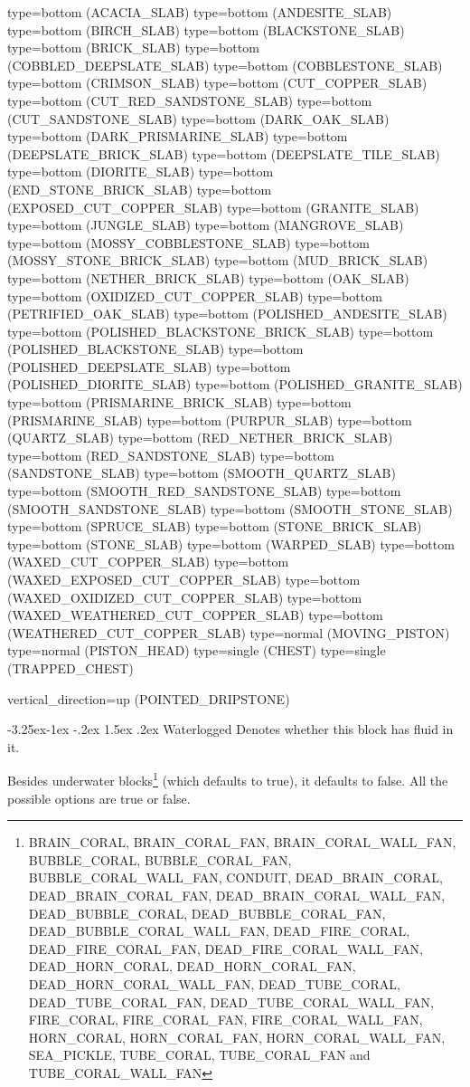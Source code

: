 \documentclass[11pt]{article}
\makeatletter
\renewcommand\subsubsection{\@startsection{subsubsection}{3}{\z@}%
                                        {-3.25ex\@plus -1ex \@minus -.2ex}%
                                         {1.5ex \@plus .2ex}%
                                         {\normalfont\normalsize\fontfamily{phv}\fontsize{14}{17}\selectfont}}
\makeatother
\begin{document}
type=bottom (ACACIA_SLAB)
type=bottom (ANDESITE_SLAB)
type=bottom (BIRCH_SLAB)
type=bottom (BLACKSTONE_SLAB)
type=bottom (BRICK_SLAB)
type=bottom (COBBLED_DEEPSLATE_SLAB)
type=bottom (COBBLESTONE_SLAB)
type=bottom (CRIMSON_SLAB)
type=bottom (CUT_COPPER_SLAB)
type=bottom (CUT_RED_SANDSTONE_SLAB)
type=bottom (CUT_SANDSTONE_SLAB)
type=bottom (DARK_OAK_SLAB)
type=bottom (DARK_PRISMARINE_SLAB)
type=bottom (DEEPSLATE_BRICK_SLAB)
type=bottom (DEEPSLATE_TILE_SLAB)
type=bottom (DIORITE_SLAB)
type=bottom (END_STONE_BRICK_SLAB)
type=bottom (EXPOSED_CUT_COPPER_SLAB)
type=bottom (GRANITE_SLAB)
type=bottom (JUNGLE_SLAB)
type=bottom (MANGROVE_SLAB)
type=bottom (MOSSY_COBBLESTONE_SLAB)
type=bottom (MOSSY_STONE_BRICK_SLAB)
type=bottom (MUD_BRICK_SLAB)
type=bottom (NETHER_BRICK_SLAB)
type=bottom (OAK_SLAB)
type=bottom (OXIDIZED_CUT_COPPER_SLAB)
type=bottom (PETRIFIED_OAK_SLAB)
type=bottom (POLISHED_ANDESITE_SLAB)
type=bottom (POLISHED_BLACKSTONE_BRICK_SLAB)
type=bottom (POLISHED_BLACKSTONE_SLAB)
type=bottom (POLISHED_DEEPSLATE_SLAB)
type=bottom (POLISHED_DIORITE_SLAB)
type=bottom (POLISHED_GRANITE_SLAB)
type=bottom (PRISMARINE_BRICK_SLAB)
type=bottom (PRISMARINE_SLAB)
type=bottom (PURPUR_SLAB)
type=bottom (QUARTZ_SLAB)
type=bottom (RED_NETHER_BRICK_SLAB)
type=bottom (RED_SANDSTONE_SLAB)
type=bottom (SANDSTONE_SLAB)
type=bottom (SMOOTH_QUARTZ_SLAB)
type=bottom (SMOOTH_RED_SANDSTONE_SLAB)
type=bottom (SMOOTH_SANDSTONE_SLAB)
type=bottom (SMOOTH_STONE_SLAB)
type=bottom (SPRUCE_SLAB)
type=bottom (STONE_BRICK_SLAB)
type=bottom (STONE_SLAB)
type=bottom (WARPED_SLAB)
type=bottom (WAXED_CUT_COPPER_SLAB)
type=bottom (WAXED_EXPOSED_CUT_COPPER_SLAB)
type=bottom (WAXED_OXIDIZED_CUT_COPPER_SLAB)
type=bottom (WAXED_WEATHERED_CUT_COPPER_SLAB)
type=bottom (WEATHERED_CUT_COPPER_SLAB)
type=normal (MOVING_PISTON)
type=normal (PISTON_HEAD)
type=single (CHEST)
type=single (TRAPPED_CHEST)

vertical_direction=up (POINTED_DRIPSTONE)

\subsubsection{Waterlogged}
Denotes whether this block has fluid in it.

Besides underwater blocks\footnote{BRAIN\_CORAL, BRAIN\_CORAL\_FAN, BRAIN\_CORAL\_WALL\_FAN, BUBBLE\_CORAL, BUBBLE\_CORAL\_FAN, BUBBLE\_CORAL\_WALL\_FAN, CONDUIT, DEAD\_BRAIN\_CORAL, DEAD\_BRAIN\_CORAL\_FAN, DEAD\_BRAIN\_CORAL\_WALL\_FAN, DEAD\_BUBBLE\_CORAL, DEAD\_BUBBLE\_CORAL\_FAN, DEAD\_BUBBLE\_CORAL\_WALL\_FAN, DEAD\_FIRE\_CORAL, DEAD\_FIRE\_CORAL\_FAN, DEAD\_FIRE\_CORAL\_WALL\_FAN, DEAD\_HORN\_CORAL, DEAD\_HORN\_CORAL\_FAN, DEAD\_HORN\_CORAL\_WALL\_FAN, DEAD\_TUBE\_CORAL, DEAD\_TUBE\_CORAL\_FAN, DEAD\_TUBE\_CORAL\_WALL\_FAN, FIRE\_CORAL, FIRE\_CORAL\_FAN, FIRE\_CORAL\_WALL\_FAN, HORN\_CORAL, HORN\_CORAL\_FAN, HORN\_CORAL\_WALL\_FAN, SEA\_PICKLE, TUBE\_CORAL, TUBE\_CORAL\_FAN and TUBE\_CORAL\_WALL\_FAN} (which defaults to true), it defaults to false. All the possible options are true or false.
\end{document}
